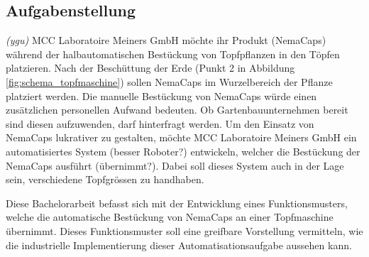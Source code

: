 \subsection{Aufgabenstellung}
\textit{(ygu)} MCC Laboratoire Meiners GmbH möchte ihr Produkt (NemaCaps) während der halbautomatischen Bestückung von Topfpflanzen in den Töpfen platzieren. Nach der Beschüttung der Erde (Punkt 2 in Abbildung \ref{fig:schema_topfmaschine}) sollen NemaCaps im Wurzelbereich der Pflanze platziert werden. Die manuelle Bestückung von NemaCaps würde einen zusätzlichen personellen Aufwand bedeuten. Ob Gartenbauunternehmen bereit sind diesen aufzuwenden, darf hinterfragt werden. Um den Einsatz von NemaCaps lukrativer zu gestalten, möchte MCC Laboratoire Meiners GmbH ein automatisiertes System (besser Roboter?) entwickeln, welcher die Bestückung der NemaCaps ausführt (übernimmt?). Dabei soll dieses System auch in der Lage sein, verschiedene Topfgrössen zu handhaben.
\newline

Diese Bachelorarbeit befasst sich mit der Entwicklung eines Funktionsmusters, welche die automatische Bestückung von NemaCaps an einer Topfmaschine übernimmt. Dieses Funktionsmuster soll eine greifbare Vorstellung vermitteln, wie die industrielle Implementierung dieser Automatisationsaufgabe aussehen kann. 
\newline 

